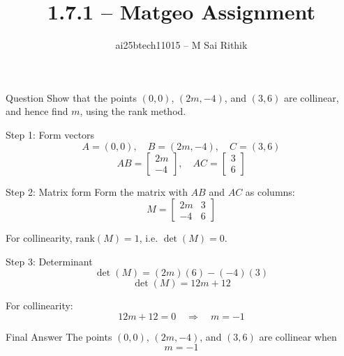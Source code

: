 \documentclass{beamer}
\title{1.7.1 -- Matgeo Assignment}
\author{ai25btech11015 -- M Sai Rithik}
\date{}
\begin{document}
\frame{\titlepage}
\begin{frame}{Question}
Show that the points \((0,0)\), \((2m,-4)\), and \((3,6)\) are collinear, and hence find \(m\), using the rank method.
\end{frame}

\begin{frame}{Step 1: Form vectors}
\[
A = (0,0), \quad B = (2m,-4), \quad C = (3,6)
\]
\[
AB = \begin{bmatrix}2m \\ -4\end{bmatrix}, 
\quad AC = \begin{bmatrix}3 \\ 6\end{bmatrix}
\]
\end{frame}

\begin{frame}{Step 2: Matrix form}
Form the matrix with \(AB\) and \(AC\) as columns:
\[
M = \begin{bmatrix}
2m & 3 \\
-4 & 6
\end{bmatrix}
\]

For collinearity, \(\text{rank}(M) = 1\), i.e. \(\det(M) = 0\).
\end{frame}

\begin{frame}{Step 3: Determinant}
\[
\det(M) = (2m)(6) - (-4)(3)
\]
\[
\det(M) = 12m + 12
\]

For collinearity:
\[
12m + 12 = 0 \quad \Rightarrow \quad m = -1
\]
\end{frame}

\begin{frame}{Final Answer}
The points \((0,0)\), \((2m,-4)\), and \((3,6)\) are collinear when
\[
\boxed{m = -1}
\]
\end{frame}
\end{document}
